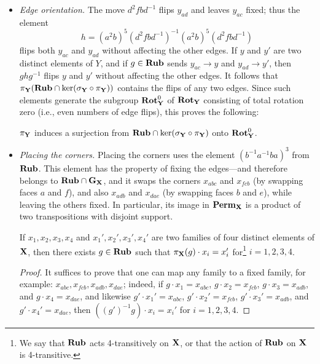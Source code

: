 \begin{itemize}
    \item \emph{Edge orientation.} The move $d^2fbd^{-1}$ flips $y_{ad}$ and leaves $y_{ac}$ fixed; thus the element
        $$
        h = (a^2b)^5 (d^2fbd^{-1})^{-1} (a^2b)^5 (d^2fbd^{-1})
        $$
        flips both $y_{ac}$ and $y_{ad}$ without affecting the other edges.
        If $y$ and $y'$ are two distinct elements of $Y$, and if $g \in \mathbf{Rub}$ sends $y_{ac} \to y$ and $y_{ad} \to y'$, then $ghg^{-1}$ flips $y$ and $y'$ without affecting the other edges.
        It follows that $\pi_{\mathbf{Y}}(\mathbf{Rub} \cap \ker(\sigma_{\mathbf{Y}} \circ \pi_{\mathbf{Y}}))$ contains the flips of any two edges.
        Since such elements generate the subgroup $\mathbf{Rot}_{\mathbf{Y}}^0$ of $\mathbf{Rot}_{\mathbf{Y}}$ consisting of total rotation zero (i.e., even numbers of edge flips), this proves the following:

    \begin{lemma}
        \label{lem:RotY0}
        $\pi_{\mathbf{Y}}$ induces a surjection from $\mathbf{Rub} \cap \ker(\sigma_{\mathbf{Y}} \circ \pi_{\mathbf{Y}})$ onto $\mathbf{Rot}_{\mathbf{Y}}^0$.
    \end{lemma}

    \item \emph{Placing the corners.}
    Placing the corners uses the element $(b^{-1}a^{-1}ba)^3$ from $\mathbf{Rub}$.
    This element has the property of fixing the edges—and therefore belongs to $\mathbf{Rub} \cap \mathbf{G}_{\mathbf{X}}$, and it swaps the corners $x_{abc}$ and $x_{fcb}$ (by swapping faces $a$ and $f$), and also $x_{adb}$ and $x_{dae}$ (by swapping faces $b$ and $e$), while leaving the others fixed.
    In particular, its image in $\mathbf{Perm}_{\mathbf{X}}$ is a product of two transpositions with disjoint support.

    \begin{lemma}
        If $x_1, x_2, x_3, x_4$ and $x_1', x_2', x_3', x_4'$ are two families of four distinct elements of $\mathbf{X}$, then there exists $g \in \mathbf{Rub}$ such that $\pi_{\mathbf{X}}(g) \cdot x_i = x_i'$ for\footnote{We say that $\mathbf{Rub}$ acts 4-transitively on $\mathbf{X}$, or that the action of $\mathbf{Rub}$ on $\mathbf{X}$ is 4-transitive.} $i = 1, 2, 3, 4$.
    \end{lemma}
    \begin{proof}
        It suffices to prove that one can map any family to a fixed family, for example: $x_{abc}, x_{fcb}, x_{adb}, x_{dae}$; indeed, if $g \cdot x_1 = x_{abc}$, $g \cdot x_2 = x_{fcb}$, $g \cdot x_3 = x_{adb}$, and $g \cdot x_4 = x_{dae}$, and likewise
        $g' \cdot x_1' = x_{abc}$, $g' \cdot x_2' = x_{fcb}$, $g' \cdot x_3' = x_{adb}$, and $g' \cdot x_4' = x_{dae}$, then
        $((g')^{-1}g) \cdot x_i = x_i'$ for $i = 1, 2, 3, 4$.


\end{proof}
\end{itemize}
